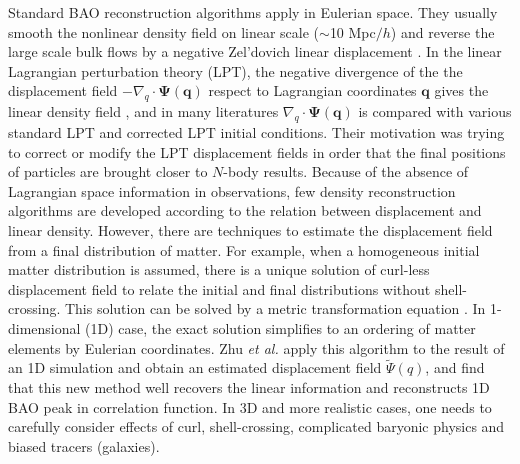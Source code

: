 \documentclass[aps,prd,twocolumn,superscriptaddress,amsfont,amssymb,amsmath,nofootinbib,showpacs,balancelastpage]{revtex4-1}
\newcommand{\bs}{\boldsymbol}
\begin{document}
Standard BAO reconstruction algorithms apply in Eulerian space.
They usually smooth the nonlinear density field on
linear scale ($\sim$10 Mpc$/h$) and reverse the large 
scale bulk flows by a negative Zel'dovich linear displacement
\citep{2007ApJ...664..675E,2009PhRvD..80l3501N,2009PhRvD..79f3523P}.
In the linear Lagrangian perturbation theory (LPT), the 
negative divergence of the the displacement field
$-\nabla_q\cdot\bs\Psi(\bs q)$ respect to Lagrangian coordinates $\bs q$
gives the linear density field \citep{2010PhDT.........4J},
and in many literatures
\cite{2013MNRAS.428..141N,2014PhRvD..89h3515C,2016JCAP...03..017B}
$\nabla_q\cdot\bs\Psi(\bs q)$ is compared with various standard LPT
and corrected LPT initial conditions. Their motivation was
trying to correct or modify the LPT displacement fields
in order that the final positions of particles are brought
closer to $N$-body results. Because of the absence
of Lagrangian space information in observations, few density
reconstruction algorithms are developed according to the relation
between displacement and linear density. However,
there are techniques to estimate the displacement field from a final 
distribution of matter.
For example, when a homogeneous initial matter distribution 
is assumed, there is a unique solution of curl-less displacement field to relate 
the initial and final distributions without shell-crossing. This solution can be 
solved by a metric transformation equation
\citep{1995ApJS..100..269P,1998ApJS..115...19P}.
In 1-dimensional (1D) case, the exact solution 
simplifies to an ordering of matter elements by Eulerian coordinates.
Zhu {\it et al.} \cite{2016arXiv160907041Z} apply this algorithm to the result
of an 1D simulation \citep{2016JCAP...01..043M} and obtain an estimated
displacement field $\tilde\Psi(q)$, and find
that this new method well recovers the linear
information and reconstructs 1D BAO peak in correlation function.
In 3D and more realistic cases, one needs to
carefully consider effects of curl, shell-crossing, 
complicated baryonic physics and biased tracers (galaxies).
\end{document}
